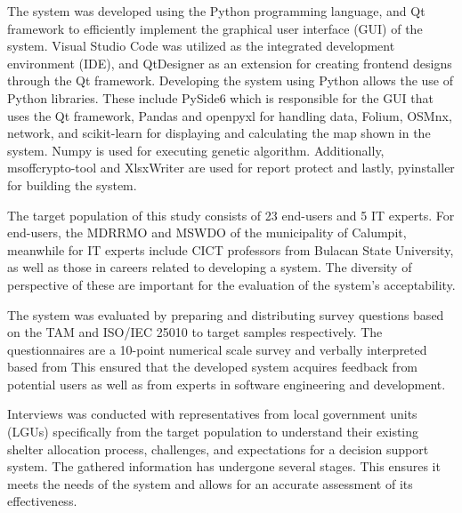 \documentclass[12pt,a4paper,]{article}
\begin{document}
	The system was developed using the Python programming language, and Qt framework to efficiently implement the graphical user interface (GUI) of the system. Visual Studio Code was utilized as the integrated development environment (IDE), and QtDesigner as an extension for creating frontend designs through the Qt framework.
	Developing the system using Python allows the use of Python libraries. These include PySide6 which is responsible for the GUI that uses the Qt framework, Pandas and openpyxl for handling data, Folium, OSMnx, network, and scikit-learn for displaying and calculating the map shown in the system. Numpy is used for executing genetic algorithm. Additionally, msoffcrypto-tool and XlsxWriter are used for report protect and lastly, pyinstaller for building the system.
	
	The target population of this study consists of 23 end-users and 5 IT experts. For end-users, the MDRRMO and MSWDO of the municipality of Calumpit, meanwhile for IT experts include CICT professors from Bulacan State University, as well as those in careers related to developing a system. The diversity of perspective of these are important for the evaluation of the system’s acceptability.
	
	The system was evaluated by preparing and distributing survey questions based on the TAM and ISO/IEC 25010 to target samples respectively. The questionnaires are a 10-point numerical scale survey and verbally interpreted based from \textcite{Eladia2024} This ensured that the developed system acquires feedback from potential users as well as from experts in software engineering and development.
	
	Interviews was conducted with representatives from local government units (LGUs) specifically from the target population to understand their existing shelter allocation process, challenges, and expectations for a decision support system. The gathered information has undergone several stages. This ensures it meets the needs of the system and allows for an accurate assessment of its effectiveness.
	
\end{document}
